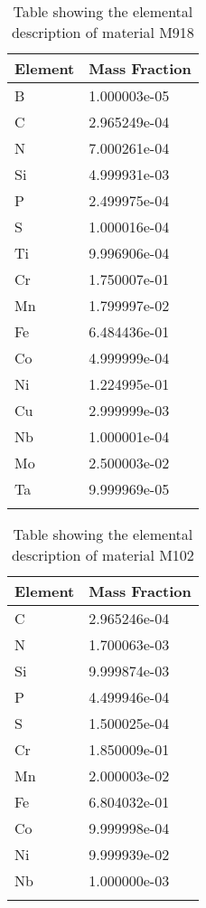 \begin{centering}
\begin{longtable}[ht!]
\caption{Table showing the elemental description of material M937}
\label{table:material_UppWater}
\end{longtable}
\clearpage

\begin{longtable}[ht!]
{ p{} | p{} }
\hline
Element & Mass Fraction\\
\hline
B &  1.000003e-05\\
C &  2.965249e-04\\
N &  7.000261e-04\\
Si &  4.999931e-03\\
P &  2.499975e-04\\
S &  1.000016e-04\\
Ti &  9.996906e-04\\
Cr &  1.750007e-01\\
Mn &  1.799997e-02\\
Fe &  6.484436e-01\\
Co &  4.999999e-04\\
Ni &  1.224995e-01\\
Cu &  2.999999e-03\\
Nb &  1.000001e-04\\
Mo &  2.500003e-02\\
Ta &  9.999969e-05\\

\caption{Table showing the elemental description of material M918}
\label{table:material_Lenses}
\end{longtable}
\clearpage

\begin{longtable}[ht!]
{ p{} | p{} }
\hline
Element & Mass Fraction\\
\hline
C &  2.965246e-04\\
N &  1.700063e-03\\
Si &  9.999874e-03\\
P &  4.499946e-04\\
S &  1.500025e-04\\
Cr &  1.850009e-01\\
Mn &  2.000003e-02\\
Fe &  6.804032e-01\\
Co &  9.999998e-04\\
Ni &  9.999939e-02\\
Nb &  1.000000e-03\\

\caption{Table showing the elemental description of material M102}
\label{table:material_M102}
\end{longtable}
\clearpage


\end{centering}
